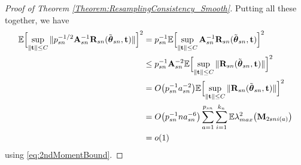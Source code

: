\begin{proof}[Proof of Theorem \ref{Theorem:ResamplingConsistency_Smooth}]
Putting all these together, we have 
%
\begin{align} 
{\mathbb{E}} \Bigl[ \sup_{ \| {\bf{t}} \| \leq C} \|
 p_{s n}^{-1/2}  {\mathbf{A}}_{ s n}^{-1} {\mathbf{R}}_{ s n} (\tilde{{\boldsymbol{\theta}}}_{s n },  {\bf{t}}) \|
 \Bigr]^{2} & = p_{s n}^{-1}  {\mathbb{E}} \Bigl[ \sup_{ \| {\bf{t}} \| \leq C} 
  {\mathbf{A}}_{ s n}^{-1} {\mathbf{R}}_{ s n} (\tilde{{\boldsymbol{\theta}}}_{s n },  {\bf{t}})
 \Bigr]^{2} \notag\\
& \leq p_{s n}^{-1}  {\mathbf{A}}_{ s n}^{-2}   {\mathbb{E}} \Bigl[ \sup_{ \| {\bf{t}} \| \leq C} 
  \| {\mathbf{R}}_{ s n} (\tilde{{\boldsymbol{\theta}}}_{s n },  {\bf{t}})\|
 \Bigr]^{2} \notag\\
 & = O \bigl( p_{s n}^{-1} a_{s n}^{-2} \bigr)
 {\mathbb{E}} \Bigl[ \sup_{ \| {\bf{t}} \| \leq C} 
  \| {\mathbf{R}}_{ s n} (\tilde{{\boldsymbol{\theta}}}_{s n },  {\bf{t}})\|
 \Bigr]^{2} \notag\\
  & = O \bigl( p_{s n}^{-1} n a_{s n}^{-6} \bigr)
\sum_{a = 1}^{ p_{s n}} 
\sum_{i = 1}^{ k_{n}} 
 {\mathbb{E}} \lambda_{max}^{2} \bigl( {\mathbf{M}}_{2 s n i (a)} \bigr) \notag\\
& = o(1)
\end{align}
using \ref{eq:2ndMomentBound}. 


\end{proof}
